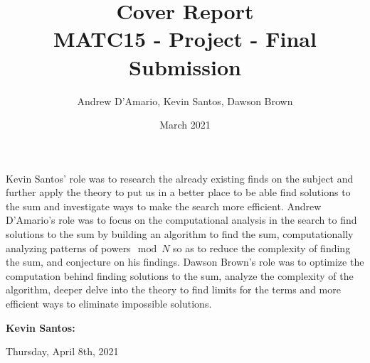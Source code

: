 \documentclass{article}
\title{Cover Report \\ \vspace{.3in} \large{MATC15 - Project - Final Submission}}
\author{Andrew D'Amario, Kevin Santos, Dawson Brown}
\date{March 2021}
\begin{document}
\maketitle

\begin{flushleft}



Kevin Santos' role was to research the already existing finds on the subject and further apply the theory to put us in a better place to be able find solutions to the sum and investigate ways to make the search more efficient.
Andrew D'Amario's role was to focus on the computational analysis in the search to find solutions to the sum by building an algorithm to find the sum, computationally analyzing patterns of powers$\mod N$ so as to reduce the complexity of finding the sum, and conjecture on his findings.
Dawson Brown's role was to optimize the computation behind finding solutions to the sum, analyze the complexity of the algorithm, deeper delve into the theory to find limits for the terms and more efficient ways to eliminate impossible solutions.

\vspace{.5in}

{\bf Kevin Santos:}
\hspace{.63in}{\bf Dawson Brown:}
\hspace{.63in}{\bf Andrew D'Amario: }  


\vspace{1in}


Thursday, April 8th, 2021

\end{flushleft}
\end{document}
